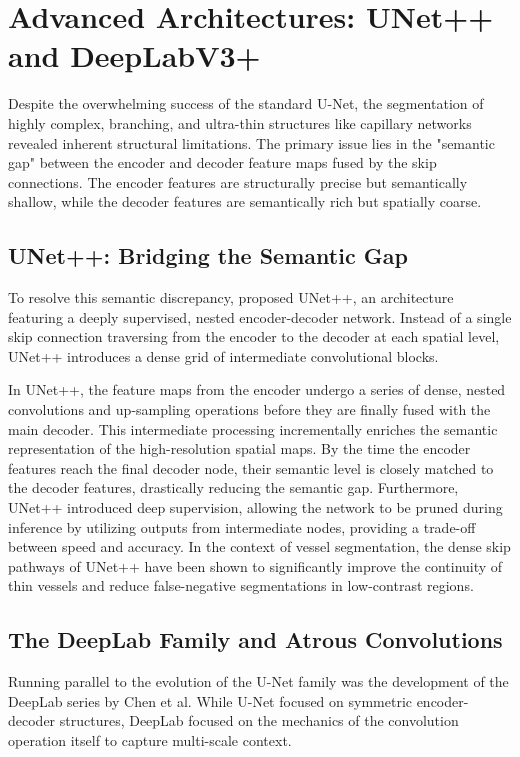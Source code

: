 \section{Advanced Architectures: UNet++ and DeepLabV3+}
Despite the overwhelming success of the standard U-Net, the segmentation of highly complex, branching, and ultra-thin structures like capillary networks revealed inherent structural limitations. The primary issue lies in the "semantic gap" between the encoder and decoder feature maps fused by the skip connections. The encoder features are structurally precise but semantically shallow, while the decoder features are semantically rich but spatially coarse.

\subsection{UNet++: Bridging the Semantic Gap}
To resolve this semantic discrepancy, \textcite{zhou2018unet++} proposed UNet++, an architecture featuring a deeply supervised, nested encoder-decoder network. Instead of a single skip connection traversing from the encoder to the decoder at each spatial level, UNet++ introduces a dense grid of intermediate convolutional blocks. 

In UNet++, the feature maps from the encoder undergo a series of dense, nested convolutions and up-sampling operations before they are finally fused with the main decoder. This intermediate processing incrementally enriches the semantic representation of the high-resolution spatial maps. By the time the encoder features reach the final decoder node, their semantic level is closely matched to the decoder features, drastically reducing the semantic gap. Furthermore, UNet++ introduced deep supervision, allowing the network to be pruned during inference by utilizing outputs from intermediate nodes, providing a trade-off between speed and accuracy. In the context of vessel segmentation, the dense skip pathways of UNet++ have been shown to significantly improve the continuity of thin vessels and reduce false-negative segmentations in low-contrast regions.

\subsection{The DeepLab Family and Atrous Convolutions}
Running parallel to the evolution of the U-Net family was the development of the DeepLab series by Chen et al. While U-Net focused on symmetric encoder-decoder structures, DeepLab focused on the mechanics of the convolution operation itself to capture multi-scale context.

